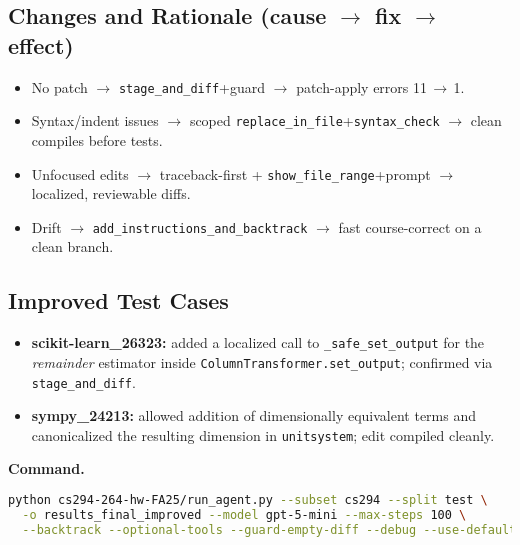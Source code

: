 \documentclass[11pt]{article}
\begin{document}
\subsection*{Changes and Rationale (cause \(\to\) fix \(\to\) effect)}
\begin{itemize}
  \item No patch \(\to\) \texttt{stage\_and\_diff}+guard \(\to\) patch-apply errors 11\,$\to$\,1.
  \item Syntax/indent issues \(\to\) scoped \texttt{replace\_in\_file}+\texttt{syntax\_check} \(\to\) clean compiles before tests.
  \item Unfocused edits \(\to\) traceback-first + \texttt{show\_file\_range}+prompt \(\to\) localized, reviewable diffs.
  \item Drift \(\to\) \texttt{add\_instructions\_and\_backtrack} \(\to\) fast course-correct on a clean branch.
\end{itemize}

\subsection*{Improved Test Cases}
\begin{itemize}
  \item \textbf{scikit-learn\_26323:} added a localized call to \texttt{\_safe\_set\_output} for the \emph{remainder} estimator inside \texttt{ColumnTransformer.set\_output}; confirmed via \texttt{stage\_and\_diff}.
  \item \textbf{sympy\_24213:} allowed addition of dimensionally equivalent terms and canonicalized the resulting dimension in \texttt{unitsystem}; edit compiled cleanly.
\end{itemize}

\noindent \textbf{Command.}
\begin{lstlisting}[style=code,language=bash]
python cs294-264-hw-FA25/run_agent.py --subset cs294 --split test \
  -o results_final_improved --model gpt-5-mini --max-steps 100 \
  --backtrack --optional-tools --guard-empty-diff --debug --use-default-instructor
\end{lstlisting}
\end{document}

